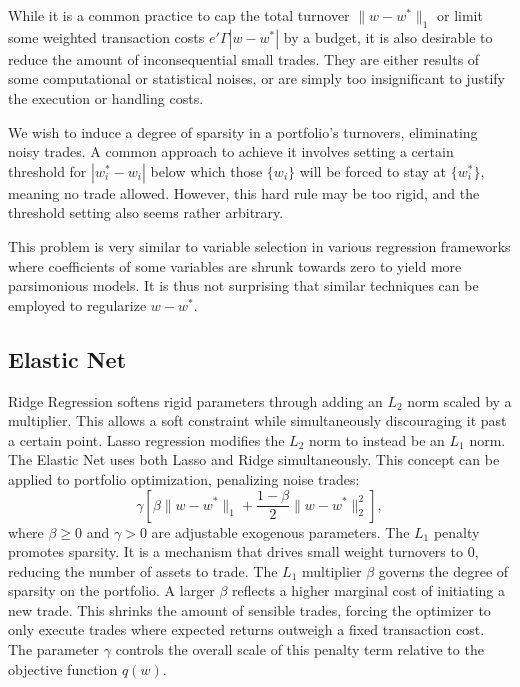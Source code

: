\documentclass[11pt, letterpaper]{article}
\begin{document}
While it is a common practice to cap the total turnover $\lVert w - w^*\rVert_1$ or limit some weighted transaction costs
$e'\Gamma |w - w^*|$ by a budget, it is also desirable to reduce the amount of inconsequential small trades. They are either
results of some computational or statistical noises, or are simply too insignificant to justify the execution or handling
costs.

We wish to induce a degree of sparsity in a portfolio's turnovers, eliminating noisy trades. A common approach to achieve it
involves setting a certain threshold for $\left |w^*_i - w_i \right|$ below which those $\{w_i\}$ will be forced to stay at
$\{w_i^*\}$, meaning no trade allowed. However, this hard rule may be too rigid, and the threshold setting also seems rather
arbitrary.

This problem is very similar to variable selection in various regression frameworks where coefficients of some variables are
shrunk towards zero to yield more parsimonious models. It is thus not surprising that similar techniques can be employed to
regularize $w - w^*$.
\subsection{Elastic Net}

Ridge Regression \cite{hoerl1970ridge} softens rigid parameters through adding an $L_2$ norm scaled by a multiplier. This allows a soft constraint while
simultaneously discouraging it past a certain point. Lasso regression \cite{tibshirani1996lasso} modifies the $L_2$ norm to instead be an $L_1$ norm.
The Elastic Net \cite{zou2005elasticnet} uses both Lasso and Ridge simultaneously. This concept can be applied to portfolio optimization,
penalizing noise trades:
\begin{equation}
	\label{elastic_net_objective}
	\gamma\left[\beta \lVert w-w^*\rVert_1 + \frac{1 - \beta}{2} \lVert w-w^*\rVert_2^2\right],
\end{equation}
where $\beta \geq 0$ and $\gamma > 0$ are adjustable exogenous parameters. The $L_1$ penalty promotes sparsity. It is a
mechanism that drives small weight turnovers to $0$, reducing the number of assets to trade. The $L_1$ multiplier $\beta$
governs the degree of sparsity on the portfolio. A larger $\beta$ reflects a higher marginal cost of initiating a new
trade. This shrinks the amount of sensible trades, forcing the optimizer to only execute trades where expected returns outweigh
a fixed transaction cost. The parameter $\gamma$ controls the overall scale of this penalty term relative to the objective
function $q(w)$.
\end{document}
